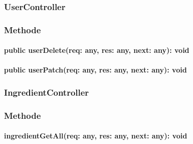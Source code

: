 \documentclass[parskip=full]{scrartcl}
\begin{document}
\subsubsection{UserController}
\subsubsection*{Methode}
\paragraph{public userDelete(req: any, res: any, next: any): void}
\paragraph{public userPatch(req: any, res: any, next: any): void}

\subsubsection{IngredientController}
\subsubsection*{Methode}
\paragraph{ingredientGetAll(req: any, res: any, next: any): void}

\newpage
\end{document}
